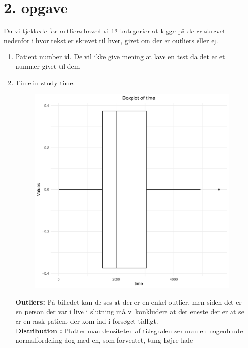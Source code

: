 \chapter{2. opgave}
Da vi tjekkede for outliers haved vi 12 kategorier at kigge på de er skrevet nedenfor i hvor tekst er skrevet til hver, givet om der er outliers eller ej.
\begin{enumerate}
\item Patient number id. \newline
De vil ikke give mening at lave en test da det er et nummer givet til dem 
\item  Time in study time.\\
\begin{figure}[h]
    \centering
    \includegraphics[width=0.6\linewidth]{Basses_kode/Billeder_duration/Boxplot_of_ time .pdf}
\end{figure}
\textbf{Outliers: }På billedet kan de ses at der er en enkel outlier, men siden det er en person der var i live i slutning må vi konkludere at det eneste der er at se er en rask patient der kom ind i forsøget tidligt.\\
\textbf{Distribution :} Plotter man densiteten af tidsgrafen ser man en nogenlunde normalfordeling dog med en, som forventet, tung højre hale



\end{enumerate}
